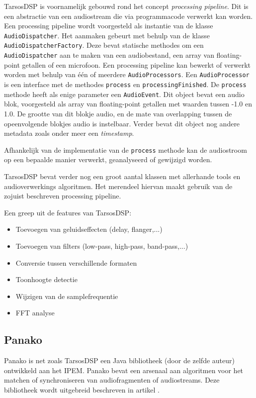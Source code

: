 TarsosDSP is voornamelijk gebouwd rond het concept \textit{processing pipeline}. Dit is een abstractie van een audiostream die via programmacode verwerkt kan worden.  Een processing pipeline wordt voorgesteld als instantie van de klasse \texttt{AudioDispatcher}. Het aanmaken gebeurt met behulp van de klasse \texttt{AudioDispatcherFactory}. Deze bevat statische methodes om een \texttt{AudioDispatcher} aan te maken van een audiobestand, een array van floating-point getallen of een microfoon. Een processing pipeline kan bewerkt of verwerkt worden met behulp van één of meerdere \texttt{AudioProcessors}. Een \texttt{AudioProcessor} is een interface met de methodes \texttt{process} en \texttt{processingFinished}. De \texttt{process} methode heeft als enige parameter een \texttt{AudioEvent}. Dit object bevat een audio blok, voorgesteld als array van floating-point getallen met waarden tussen -1.0 en 1.0. De grootte van dit blokje audio, en de mate van overlapping tussen de opeenvolgende blokjes audio is instelbaar. Verder bevat dit object nog andere metadata zoals onder meer een \textit{timestamp}.

Afhankelijk van de implementatie van de \texttt{process} methode kan de audiostroom op een bepaalde manier verwerkt, geanalyseerd of gewijzigd worden.

TarsosDSP bevat verder nog een groot aantal klassen met allerhande tools en audioverwerkings algoritmen. Het merendeel hiervan maakt gebruik van de zojuist beschreven processing pipeline. 

Een greep uit de features van TarsosDSP:
\begin{itemize}[noitemsep]
	\item Toevoegen van geluidseffecten (delay, flanger,...)
	\item Toevoegen van filters (low-pass, high-pass, band-pass,...)
	\item Conversie tussen verschillende formaten
	\item Toonhoogte detectie
	\item Wijzigen van de samplefrequentie
	\item FFT analyse
\end{itemize}

\subsection{Panako}

Panako is net zoals TarsosDSP een Java bibliotheek (door de zelfde auteur) ontwikkeld aan het IPEM. Panako bevat een arsenaal aan algoritmen voor het matchen of synchroniseren van audiofragmenten of audiostreams.  Deze bibliotheek wordt uitgebreid beschreven in artikel \cite{six2014panako}.


